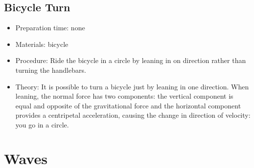 \subsection{Bicycle Turn}
\begin{itemize}
\item{Preparation time: none}
\item{Materials: bicycle}
\item{Procedure: Ride the bicycle in a circle by leaning in on direction rather than turning the handlebars.}
\item{Theory: It is possible to turn a bicycle just by leaning in one direction. When leaning, the normal force has two components: the vertical component is equal and opposite of the gravitational force and the horizontal component provides a centripetal acceleration, causing the change in direction of velocity: you go in a circle.}
\end{itemize}

\section{Waves}

